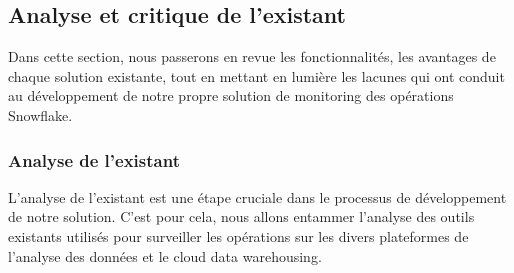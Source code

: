 \subsection{Analyse et critique de l'existant}
Dans cette section, nous passerons en revue les fonctionnalités, les avantages de chaque solution existante, tout en mettant en lumière les lacunes qui ont conduit au développement de notre propre solution de monitoring des opérations Snowflake.
\subsubsection{Analyse de l'existant}
\par L'analyse de l'existant est une étape cruciale dans le processus de développement de notre solution.
C'est pour cela, nous allons entammer l'analyse des outils existants utilisés pour surveiller les opérations sur les divers plateformes de l'analyse des données et le cloud data warehousing.
